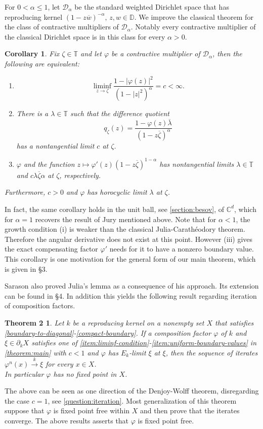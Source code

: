 \documentclass[leqno, final]{article}
\newtheorem{corollary}{Corollary}
\newtheorem*{theorem2}{Theorem 2} %
\theoremstyle{definition}
\newcommand{\xto}[1]{\stackrel{#1}{\to}}
\newcommand{\disk}{\mathbb{D}}
\newcommand{\plane}{\mathbb{C}}
\newcommand{\dirichlet}{\mathcal{D}}
\newcommand{\torus}{\mathbb{T}}
\renewcommand{\phi}{\varphi}
\begin{document}
For $0<\alpha\leq1$, let $\dirichlet_\alpha$ be the standard weighted Dirichlet space that
has reproducing kernel $(1-z\overline w)^{-\alpha},\,z,w\in\disk$. We improve the classical
theorem for the class of contractive multipliers of $\dirichlet_\alpha$. Notably
every contractive multiplier of the classical Dirichlet space is in this class for
every $\alpha>0$.
\addtocounter{corollary}{1}
\begin{corollary}
Fix $\zeta\in\torus$ and let $\phi$ be a contractive multiplier of $\dirichlet_\alpha$, then
the following are equivalent: \begin{enumerate}[label=(\roman*)]
\item \[
	\liminf_{z\to\zeta}\frac{1-|\phi(z)|^2}{(1-|z|^2)^\alpha} = c < \infty.
\]
\item There is a $\lambda\in\torus$ such that the difference quotient \[
	q_\zeta(z) = \frac{1-\phi(z)\overline\lambda}{(1-z\overline\zeta)^\alpha}
\]
has a nontangential limit $c$ at $\zeta$.
\item $\phi$ and the function $z\mapsto \phi'(z)(1-z\overline\zeta)^{1-\alpha}$ has nontangential
limits $\lambda\in\torus$ and $c\lambda\overline\zeta\alpha$ at $\zeta$, respectively.
\end{enumerate}
Furthermore, $c>0$ and $\phi$ has horocyclic limit $\lambda$ at $\zeta$.
\end{corollary}
\addtocounter{corollary}{-2}
\noindent In fact, the same corollary holds in the unit ball, see \cref{section:besov},
of $\plane^d$, which for $\alpha=1$ recovers the result of Jury mentioned above.
Note that for $\alpha<1$, the growth condition (i) is weaker than the classical
Julia-Carathéodory theorem. Therefore the angular derivative does not
exist at this point. However (iii) gives the exact compensating factor
$\phi'$ needs for it to have a nonzero boundary value.
This corollary is one motivation for the general form of our main theorem, which is given
in \S3.

Sarason also proved Julia's lemma as a consequence of his approach.
Its extension can be found in \S4. In addition this yields the following
result regarding iteration of composition factors.
\begin{theorem2}
Let $k$ be a reproducing kernel on a nonempty set $X$ that satisfies
\ref{boundary-to-diagonal}-\ref{compact-boundary}.
If a composition factor $\phi$ of $k$ and $\xi\in\partial_kX$ satisfies one of
\ref{item:liminf-condition}-\ref{item:uniform-boundary-values} in \cref{theorem:main}
with $c < 1$ and $\phi$ has $E_k$-limit $\xi$ at $\xi$, then the sequence of
iterates $\phi^n(x)\xto{k}\xi$ for every $x\in X$.
\\ In particular $\phi$ has no fixed point in $X$.
\end{theorem2}
\noindent The above can be seen as one direction of the Denjoy-Wolff theorem, disregarding the case $c=1$,
see \cref{question:iteration}. Most generalization of this theorem suppose that $\phi$
is fixed point free within $X$ and then prove that the iterates converge. The above results
asserts that $\phi$ is fixed point free.
\end{document}
